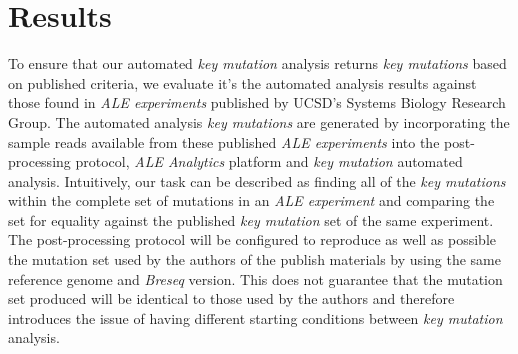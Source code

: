 \documentclass[12pt,final,masters,chapterheads]{ucsd}  %
\begin{document}
\section{Results}

%
%

To ensure that our automated \textit{key mutation} analysis returns \textit{key mutations} based on published criteria, we evaluate it's the automated analysis results against those found in \textit{ALE experiments} published by UCSD's Systems Biology Research Group. The automated analysis \textit{key mutations} are generated by incorporating the sample reads available from these published \textit{ALE experiments} into the post-processing protocol, \textit{ALE Analytics} platform and \textit{key mutation} automated analysis. Intuitively, our task can be described as finding all of the \textit{key mutations} within the complete set of mutations in an \textit{ALE experiment} and comparing the set for equality against the published \textit{key mutation} set of the same experiment. The post-processing protocol will be configured to reproduce as well as possible the mutation set used by the authors of the publish materials by using the same reference genome and \textit{Breseq} version. This does not guarantee that the mutation set produced will be identical to those used by the authors and therefore introduces the issue of having different starting conditions between \textit{key mutation} analysis.

%
%
\end{document}
